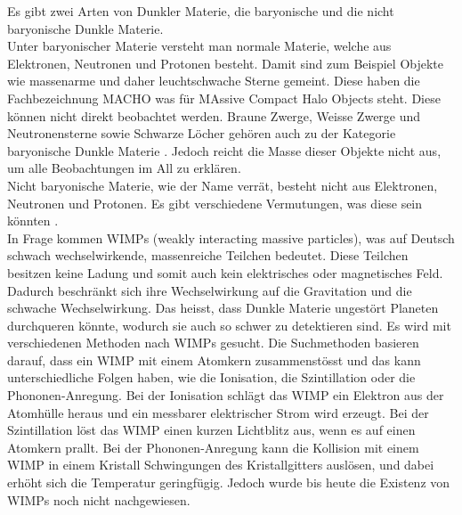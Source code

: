 Es gibt zwei Arten von Dunkler Materie, die baryonische und die nicht baryonische Dunkle Materie.\\ Unter baryonischer Materie versteht man normale Materie, welche aus Elektronen, Neutronen und Protonen besteht. Damit sind zum Beispiel Objekte wie massenarme und daher leuchtschwache Sterne gemeint. Diese haben die Fachbezeichnung \glqq MACHO\grqq{} was für \glqq MAssive Compact Halo Objects\grqq{} steht. Diese können nicht direkt beobachtet werden. Braune Zwerge, Weisse Zwerge und Neutronensterne sowie Schwarze Löcher gehören auch zu der Kategorie baryonische Dunkle Materie \cite{Bührke2022}.
Jedoch reicht die Masse dieser Objekte nicht aus, um alle Beobachtungen im All zu erklären\cite{Moeller2010}.\\ Nicht baryonische Materie, wie der Name verrät, besteht nicht aus Elektronen, Neutronen und Protonen. Es gibt verschiedene Vermutungen, was diese sein könnten \cite{Anderl2023}.\\
In Frage kommen WIMPs (weakly interacting massive particles), was auf Deutsch schwach wechselwirkende, massenreiche Teilchen bedeutet. Diese Teilchen besitzen keine Ladung und somit auch kein elektrisches oder magnetisches Feld. Dadurch beschränkt sich ihre Wechselwirkung auf die Gravitation und die schwache Wechselwirkung. Das heisst, dass Dunkle Materie ungestört Planeten durchqueren könnte, wodurch sie auch so schwer zu detektieren sind. 
Es wird mit verschiedenen Methoden nach WIMPs gesucht. Die Suchmethoden basieren darauf, dass ein WIMP mit einem Atomkern zusammenstösst und das kann unterschiedliche Folgen haben, wie die Ionisation, die Szintillation oder die Phononen-Anregung. Bei der Ionisation schlägt das WIMP ein Elektron aus der Atomhülle heraus und ein messbarer elektrischer Strom wird erzeugt.
Bei der Szintillation löst das WIMP einen kurzen Lichtblitz aus, wenn es auf einen Atomkern prallt. Bei der Phononen-Anregung kann die Kollision mit einem WIMP in einem Kristall Schwingungen des Kristallgitters auslösen, und dabei erhöht sich die Temperatur geringfügig. Jedoch wurde bis heute die Existenz von WIMPs noch nicht nachgewiesen. \cite{Bührke2022} 
